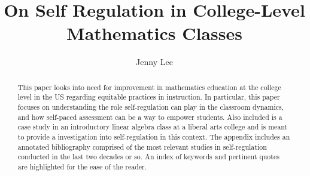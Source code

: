 \documentclass[mathematics]{hmcthesis}
\title{On Self Regulation in College-Level Mathematics Classes}
\author{Jenny Lee}
\begin{document}

\frontmatter




\maketitle



\begin{abstract}
  This paper looks into need for improvement in mathematics education at the college level in the US regarding equitable practices in instruction. In particular, this paper focuses on understanding the role self-regulation can play in the classroom dynamics, and how self-paced assessment can be a way to empower students. Also included is a case study in an introductory linear algebra class at a liberal arts college and is meant to provide a investigation into self-regulation in this context. The appendix includes an annotated bibliography comprised of the most relevant studies in self-regulation conducted in the last two decades or so. An index of keywords and pertinent quotes are highlighted for the ease of the reader.
\end{abstract}



\tableofcontents
\end{document}
